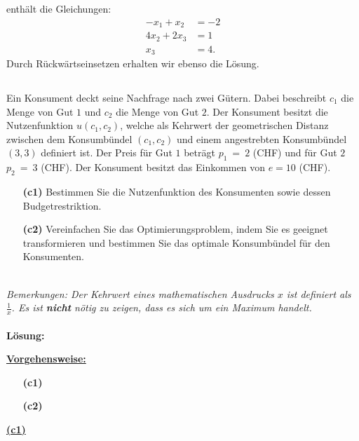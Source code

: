 enthält die Gleichungen:
\begin{align*}
	-x_1 + x_2 &= -2 \\
	4 x_2 + 2 x_3 &= 1 \\
	x_3 &= 4.
\end{align*}
Durch Rückwärtseinsetzen erhalten wir ebenso die Lösung.
\newpage
\subsection*{}
Ein Konsument deckt seine Nachfrage nach zwei Gütern. Dabei beschreibt $ c_1 $ die Menge von Gut $ 1 $ und $ c_2 $ die Menge von Gut $ 2 $. Der Konsument besitzt die Nutzenfunktion $ u(c_1,c_2) $, welche als Kehrwert der geometrischen Distanz zwischen dem Konsumbündel $ (c_1,c_2) $ und einem angestrebten Konsumbündel $ (3,3) $ definiert ist. Der Preis für Gut $ 1 $ beträgt $ p_1 \ = \ 2 $ (CHF) und für Gut $ 2 $ $ p_2 \ = \ 3 $ (CHF). Der Konsument besitzt das Einkommen von $ e = 10 $ (CHF).
\begin{enumerate}
	\item[\textbf{(c1)}] 
	Bestimmen Sie die Nutzenfunktion des Konsumenten sowie dessen Budgetrestriktion.
	\item[\textbf{(c2)}]
	Vereinfachen Sie das Optimierungsproblem, indem Sie es geeignet transformieren und bestimmen Sie das optimale Konsumbündel für den Konsumenten.
\end{enumerate}
\ \\
\textit{Bemerkungen: Der Kehrwert eines mathematischen Ausdrucks $ x $ ist definiert als $ \frac{1}{x} $. Es ist \textbf{nicht} nötig zu zeigen, dass es sich um ein Maximum handelt.}
\\ \\
\textbf{Lösung:}
\begin{mdframed}
\underline{\textbf{Vorgehensweise:}}
\begin{enumerate}
\item[\textbf{(c1)}] 
\item[\textbf{(c2)}] 
\end{enumerate}
\end{mdframed}

\underline{\textbf{(c1)} }\\



\newpage

